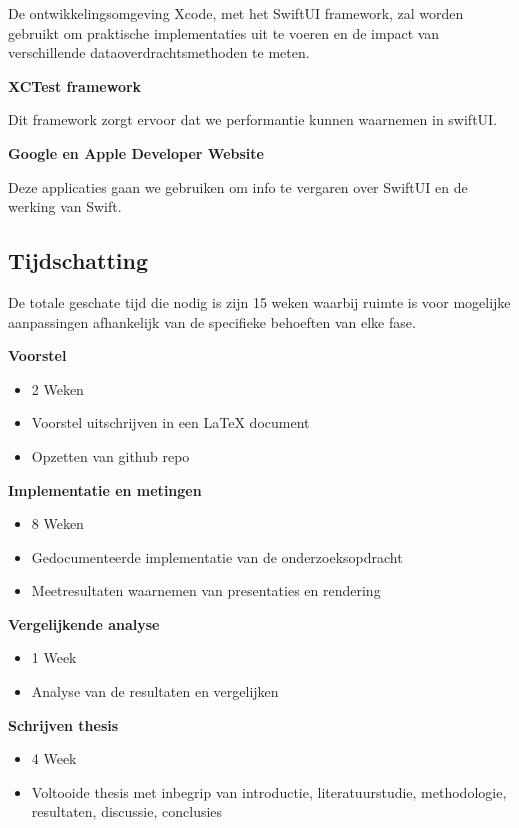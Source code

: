 De ontwikkelingsomgeving Xcode, met het SwiftUI framework, zal worden gebruikt om praktische implementaties uit te voeren en de impact van verschillende dataoverdrachtsmethoden te meten.

\textbf{XCTest framework}

Dit framework zorgt ervoor dat we performantie kunnen waarnemen in swiftUI.

\textbf{Google en Apple Developer Website}

Deze applicaties gaan we gebruiken om info te vergaren over SwiftUI en de werking van Swift.


\subsection{Tijdschatting}
De totale geschate tijd die nodig is zijn 15 weken waarbij ruimte is voor mogelijke aanpassingen afhankelijk van de specifieke behoeften van elke fase.

\textbf{Voorstel}
\begin{itemize}
    \item {2 Weken}
    \item {Voorstel uitschrijven in een LaTeX document}
    \item {Opzetten van github repo}
\end{itemize}

\textbf{Implementatie en metingen}
\begin{itemize}
    \item {8 Weken}
    \item {Gedocumenteerde implementatie van de onderzoeksopdracht}
    \item {Meetresultaten waarnemen van presentaties en rendering}
\end{itemize}

\textbf{Vergelijkende analyse}
\begin{itemize}
    \item {1 Week}
    \item {Analyse van de resultaten en vergelijken}
\end{itemize}

\textbf{Schrijven thesis}
\begin{itemize}
    \item {4 Week}
    \item {Voltooide thesis met inbegrip van introductie, literatuurstudie, methodologie, resultaten, discussie, conclusies}
\end{itemize}



